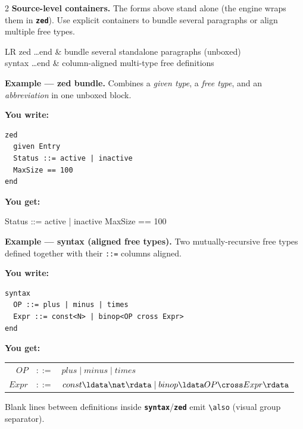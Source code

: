 \documentclass[10pt,landscape,a4paper]{article}
\newcommand{\kw}[1]{\texttt{\bfseries #1}}
\newenvironment{exwrite}%
  {\par\nobreak\noindent\scriptsize\textbf{You write:}\par\nobreak\vspace{0pt}\scriptsize}%
  {\vspace{1pt}\nobreak}
\newenvironment{exget}%
  {\par\nobreak\noindent\scriptsize\textbf{You get:}\par\nobreak\vspace{0pt}\small}%
  {\par\vspace{3pt}}
\begin{document}
\begin{multicols}{2}
\smallskip
{}
\textbf{Source-level containers.} The forms above stand alone (the engine wraps them in \kw{zed}).  Use explicit containers to bundle several paragraphs or align multiple free types.

\begin{tabularx}{\columnwidth}{LR}
zed \ldots end       & bundle several standalone paragraphs (unboxed) \\
syntax \ldots end    & column-aligned multi-type free definitions \\
\end{tabularx}

\smallskip
{}
\textbf{Example — zed bundle.}  Combines a \textit{given type}, a \textit{free type}, and an \textit{abbreviation} in one unboxed block.

\begin{exwrite}%
\begin{verbatim}
zed
  given Entry
  Status ::= active | inactive
  MaxSize == 100
end
\end{verbatim}
\end{exwrite}
\begin{exget}%
\begin{zed}
[Entry] \also
Status ::= active | inactive \also
MaxSize == 100
\end{zed}
\end{exget}

\smallskip
{}
\textbf{Example — syntax (aligned free types).}  Two mutually-recursive free types defined together with their \texttt{::=} columns aligned.

\begin{exwrite}%
\begin{verbatim}
syntax
  OP ::= plus | minus | times
  Expr ::= const<N> | binop<OP cross Expr>
end
\end{verbatim}
\end{exwrite}
\begin{exget}%
\begin{tabular}{rcl}
$OP$   & $::=$ & $plus \mid minus \mid times$ \\
$Expr$ & $::=$ & $const \ldata \nat \rdata \mid binop \ldata OP \cross Expr \rdata$
\end{tabular}
\end{exget}

{\scriptsize Blank lines between definitions inside \kw{syntax}/\kw{zed} emit \texttt{\textbackslash also} (visual group separator).}

\end{multicols}
\end{document}
